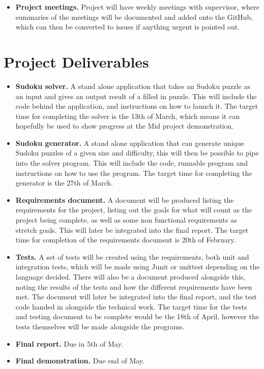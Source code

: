 \documentclass[a4paper,10pt]{article}
\begin{document}
\begin{itemize}
\begin{itemize}
	\end{itemize} 
	\item \textbf{Project meetings.} Project will have weekly meetings with supervisor, where summaries of the meetings will be documented and added onto the GitHub, which can then be converted to issues if anything urgent is pointed out.
\end{itemize}
\section*{Project Deliverables}
\begin{itemize}
	\item \textbf{Sudoku solver.} A stand alone application that takes an Sudoku puzzle as an input and gives an output result of a filled in puzzle. This will include the code behind the application, and instructions on how to launch it. The target time for completing the solver is the 13th of March, which means it can hopefully be used to show progress at the Mid project demonstration.
	\item \textbf{Sudoku generator.} A stand alone application that can generate unique Sudoku puzzles of a given size and difficulty, this will then be possible to pipe into the solver program. This will include the code, runnable program and instructions on how to use the program. The target time for completing the generator is the 27th of March.
	\item \textbf{Requirements document.} A document will be produced listing the requirements for the project, listing out the goals for what will count as the project being complete, as well as some non functional requirements as stretch goals. This will later be integrated into the final report. The target time for completion of the requirements document is 20th of February.
	\item \textbf{Tests.} A set of tests will be created using the requirements, both unit and integration tests, which will be made using Junit or unittest depending on the language decided. There will also be a document produced alongside this, noting the results of the tests and how the different requirements have been met. The document will later be integrated into the final report, and the test code handed in alongside the technical work. The target time for the tests and testing document to be complete would be the 18th of April, however the tests themselves will be made alongside the programs.
	\item \textbf{Final report.} Due in 5th of May.
	\item \textbf{Final demonstration.} Due end of May.
\end{itemize}
\end{document}
